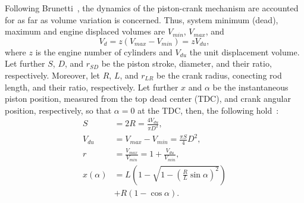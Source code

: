     Following Brunetti~\cite{2012-BrunettiF-Blucher}, the dynamics of the piston-crank mechanism are accounted  for  as  far  as
    volume variation is concerned. Thus, system minimum (dead), maximum and engine displaced volumes are  $V_{min}$,  $V_{max}$,
    and%
    \begin{equation}
        V_d = z(V_{max} - V_{min}) = zV_{du},
        \label{eq:Vd}
    \end{equation}
    \noindent where $z$ is the engine number of cylinders and $V_{du}$ the unit displacement volume. Let further $S$,  $D$,  and
    $r_{SD}$ be the piston stroke, diameter, and their ratio, respectively. Moreover, let $R$, $L$, and $r_{LR}$  be  the  crank
    radius, conecting rod length, and their ratio, respectively. Let further $x$ and $\alpha$ be the instantaneous piston
    position, measured from the top dead center (TDC), and crank angular position, respectively, so that $\alpha = 0$ at the
    TDC, then, the following hold~\cite{2012-BrunettiF-Blucher, 2017-NaaktgeborenC-IntJMechEngEduc}:%
    \begin{align}
        \label{eq:S}
        S           &= 2R = \frac{4 V_{du}}{\pi D^{2}}, \\
        \label{eq:Vdu}
        V_{du}      &= V_{max} - V_{min} = \frac{\pi S}{4} D^{2}, \\
        \label{eq:r}
        r           &= \frac{V_{max}}{V_{min}} = 1 + \frac{V_{du}}{V_{min}}, \\
        \label{eq:x}
        x(\alpha)   &=
            L\left(
                1 - \sqrt{
                    1 - \left(\frac{R}{L}\sin\alpha\right)^2
                }
            \right) \nonumber\\
                    &+ R(1 - \cos\alpha).
    \end{align}


